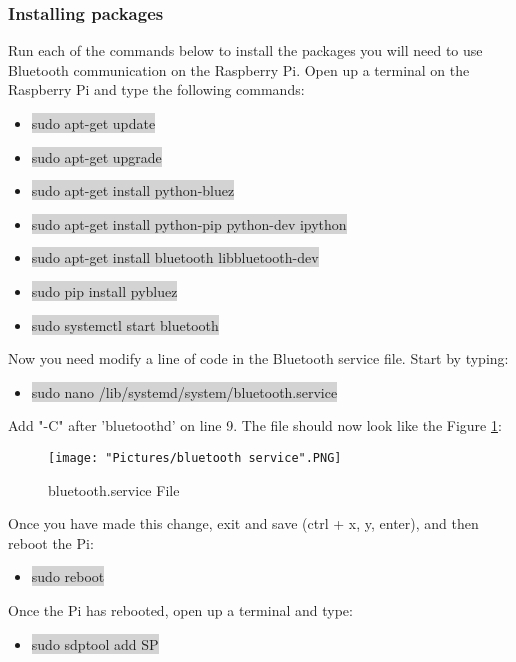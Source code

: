 \documentclass[12pt]{article}
\begin{document}
\subsubsection{Installing packages}
Run each of the commands below to install the packages you will need to use Bluetooth communication on the Raspberry Pi. Open up a terminal on the Raspberry Pi  and type the following commands:
\begin{itemize}
	\item[] \colorbox{lightgray}{sudo apt-get update}
	\item[] \colorbox{lightgray}{sudo apt-get upgrade}
	\item[] \colorbox{lightgray}{sudo apt-get install python-bluez}
	\item[] \colorbox{lightgray}{sudo apt-get install python-pip python-dev ipython}
	\item[] \colorbox{lightgray}{sudo apt-get install bluetooth libbluetooth-dev}
	\item[] \colorbox{lightgray}{sudo pip install pybluez}
	\item[] \colorbox{lightgray}{sudo systemctl start bluetooth}

\end{itemize}

\noindent Now you need modify a line of code in the Bluetooth service file. Start by typing:
\begin{itemize}
	\item[] \colorbox{lightgray}{sudo nano /lib/systemd/system/bluetooth.service}
\end{itemize}
\noindent Add "-C" after 'bluetoothd' on line 9. The file should now look like the Figure \ref{bs}:

\begin{figure}[H]
 	\centering
	\texttt{[image: "Pictures/bluetooth service".PNG]}
	\caption{bluetooth.service File}
	\label{bs}
\end{figure}
	
\noindent Once you have made this change, exit and save (ctrl + x, y, enter), and then reboot the Pi:

\begin{itemize}
	\item[] \colorbox{lightgray}{sudo reboot}
\end{itemize}

\noindent Once the Pi has rebooted, open up a terminal and type:
\begin{itemize}
	\item[] \colorbox{lightgray}{sudo sdptool add SP}
\end{itemize}
\end{document}
